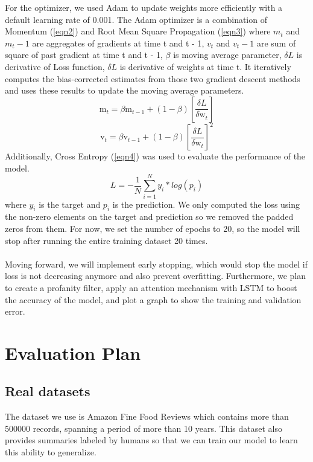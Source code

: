 \documentclass[conference]{IEEEtran}
\begin{document}
For the optimizer, we used Adam to update weights more efficiently with a default learning rate of 0.001.
The Adam optimizer is a combination of Momentum (\ref{eqn2}) and Root Mean Square Propagation (\ref{eqn3}) where $m_t$ and $m_t-1$ are aggregates of gradients at time t and t - 1, $v_t$ and $v_t-1$ are sum of square of past gradient at time t and t - 1, $\beta$ is moving average parameter, $\delta L$ is derivative of Loss function, $\delta L$ is derivative of weights at time t. It iteratively computes the bias-corrected estimates from those two gradient descent methods and uses these results to update the moving average parameters.
\begin{equation}
    \label{eqn2}
    \mathrm{m}_{t}^{} = \beta\mathrm{m}_{t-1}^{} + (1-\beta)\left[ \frac{\delta L}{\delta \mathrm{w}_{t}^{}} \right]
\end{equation}    
\begin{equation}
    \label{eqn3}
    \mathrm{v}_{t}^{} = \beta\mathrm{v}_{t-1}^{} + (1-\beta)\left[ \frac{\delta L}{\delta \mathrm{w}_{t}^{}} \right]^2
\end{equation}    
 Additionally, Cross Entropy (\ref{eqn4}) was used to evaluate the performance of the model. 
\begin{equation}
    \label{eqn4}
    L = - \dfrac{1}{N} \sum_{i = 1}^{N} y_i * log(p_i)
\end{equation}    
where $y_i$ is the target and $p_i$ is the prediction. We only computed the loss using the non-zero elements on the target and prediction so we removed the padded zeros from them. 
For now, we set the number of epochs to 20, so the model will stop after running the entire training dataset 20 times.  \\ \\ 
\indent Moving forward, we will implement early stopping, which would stop the model if loss is not decreasing anymore and also prevent overfitting. Furthermore, we plan to create a profanity filter, apply an attention mechanism with LSTM to boost the accuracy of the model, and plot a graph to show the training and validation error.


\section{Evaluation Plan}
\subsection{Real datasets}
The dataset we use is Amazon Fine Food Reviews which contains more than 500000 records, spanning a period of more than 10 years. This dataset also provides summaries labeled by humans so that we can train our model to learn this ability to generalize. 
\end{document}
